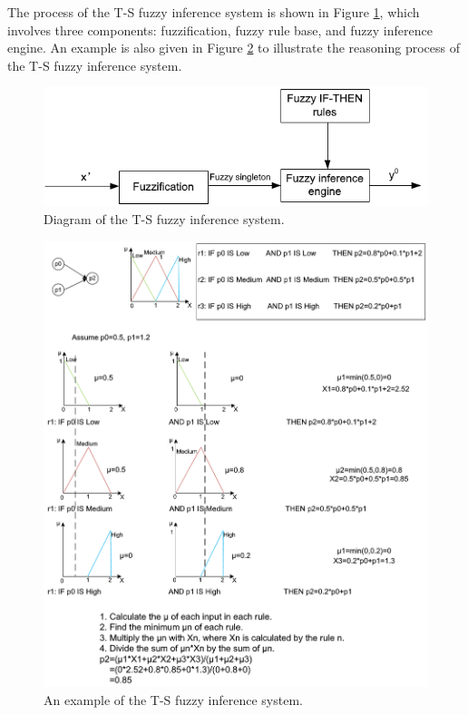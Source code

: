 \documentclass[journal,a4paper,onecolumn]{article}
\begin{document}
The process of the T-S fuzzy inference system is shown in Figure \ref{fig:diagram-T-S}, which involves three components: fuzzification, fuzzy rule base, and fuzzy inference engine. An example is also given in Figure \ref{fig:example-T-S} to illustrate the reasoning process of the T-S fuzzy inference system.

\begin{figure}[!hbt]
	\begin{center}
		\includegraphics[width=0.7\columnwidth]{fig49}
		\caption{Diagram of the T-S fuzzy inference system.}
		\label{fig:diagram-T-S}
	\end{center}
\end{figure}

\begin{figure}[!hbt]
	\begin{center}
		\includegraphics[width=\columnwidth]{fuzzy_logic_example1}
		\caption{An example of the T-S fuzzy inference system.}
		\label{fig:example-T-S}
	\end{center}
\end{figure}
\end{document}
